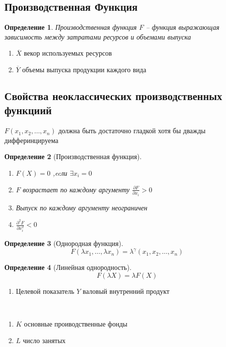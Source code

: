 \documentclass[14pt]{extarticle}
\newtheorem{definition}{Определение}
\begin{document}
\subsection{Производственная Функция}
\begin{definition}
	Производственная функция $F$ -- 
	функция выражающая зависимость между
	затратами ресурсов и объемами выпуска
\end{definition}
\begin{enumerate}
	\item $\overline{X}$  векор используемых ресурсов
	\item $\overline{Y}$ объемы выпуска продукции каждого вида
\end{enumerate}
\subsection{Свойства неоклассических производственных функциий}
$F(x_1,x_2,\dots,x_{n})$ должна быть достаточно гладкой
хотя бы дважды дифферинцируема
\begin{definition}[Производственная функция]
	\label{pf}
	\begin{enumerate}
		\item $F(X) = 0$ ,ecли  $\exists  x_{i} = 0$
		\item $F$ возрастает по каждому аргументу  $\frac{\partial F}{\partial x_{i}}> 0$ 
		\item Выпуск по каждому аргументу неограничен
		\item $\frac{\partial ^2 F}{\partial x_{i}^2} < 0$
	\end{enumerate}
\end{definition}
\begin{definition}[Однородная функция]
	\begin{equation}
	F(\lambda x_1,\dots,\lambda x_{n}) = \lambda^{\gamma}(x_1,x_2,\dots,x_{n})
	\end{equation} 
\end{definition}
\begin{definition}[Линейная однородность]
	\begin{equation}
	F(\lambda X) = \lambda F(X)
	\end{equation} 
\end{definition}
\begin{enumerate}
	\item Целевой показатель $Y$ валовый внутренний продукт
\end{enumerate}\
\begin{enumerate}
	\item $K$ основные проиводственные фонды
	\item  $L$ число занятых
\end{enumerate}
\end{document}
